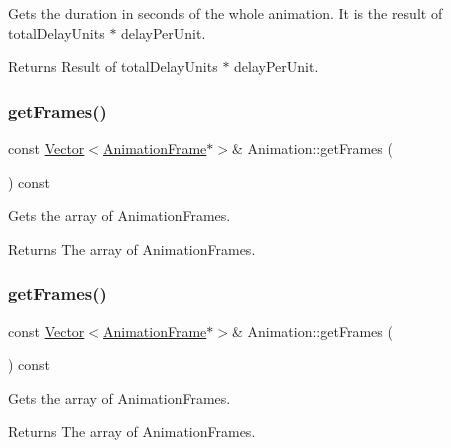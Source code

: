 Gets the duration in seconds of the whole animation. It is the result of total\+Delay\+Units $\ast$ delay\+Per\+Unit.

\begin{DoxyReturn}{Returns}
Result of total\+Delay\+Units $\ast$ delay\+Per\+Unit. 
\end{DoxyReturn}
\mbox{\label{classAnimation_a0f750cb26248e179ab8791c0bbb78057}} 
\subsubsection{\texorpdfstring{get\+Frames()}{getFrames()}\hspace{0.1cm}{\footnotesize\ttfamily [1/2]}}
{\footnotesize\ttfamily const \hyperlink{classVector}{Vector}$<$\hyperlink{classAnimationFrame}{Animation\+Frame}$\ast$$>$\& Animation\+::get\+Frames (\begin{DoxyParamCaption}{ }\end{DoxyParamCaption}) const\hspace{0.3cm}{\ttfamily [inline]}}

Gets the array of Animation\+Frames.

\begin{DoxyReturn}{Returns}
The array of Animation\+Frames. 
\end{DoxyReturn}
\mbox{\label{classAnimation_a0f750cb26248e179ab8791c0bbb78057}} 
\subsubsection{\texorpdfstring{get\+Frames()}{getFrames()}\hspace{0.1cm}{\footnotesize\ttfamily [2/2]}}
{\footnotesize\ttfamily const \hyperlink{classVector}{Vector}$<$\hyperlink{classAnimationFrame}{Animation\+Frame}$\ast$$>$\& Animation\+::get\+Frames (\begin{DoxyParamCaption}{ }\end{DoxyParamCaption}) const\hspace{0.3cm}{\ttfamily [inline]}}

Gets the array of Animation\+Frames.

\begin{DoxyReturn}{Returns}
The array of Animation\+Frames. 
\end{DoxyReturn}
\mbox{\label{classAnimation_a8d7832e8872f8c7ae4c6c63181506da3}} 
